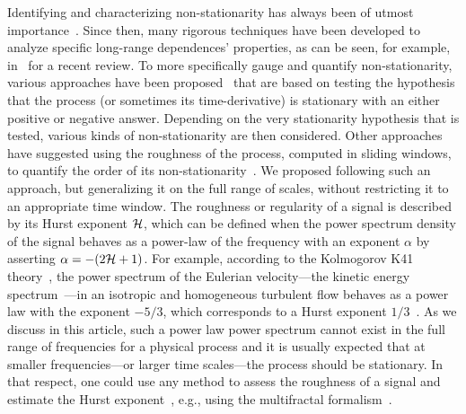 \documentclass[aps,pra,groupedaddress,notitlepage]{revtex4-1}
\begin{document}
Identifying and characterizing non-stationarity has always been of utmost importance~\cite{Grenander1957,Priestley1969}. 
Since then, many rigorous techniques have been developed to analyze specific long-range dependences' properties, as can be seen, for example, in~\cite{Beran:2013} for a recent review. To more specifically gauge and quantify non-stationarity, various
approaches have been proposed~\cite{Sachs2000,Dwivedi2011,Dette2011,Barlett2015,Jentsch2015,Cardinally2018} that are based on testing the hypothesis that the process (or sometimes its time-derivative) is stationary with an either positive or negative answer. Depending on the very stationarity hypothesis that is tested, various kinds of non-stationarity are then considered. 
%
Other approaches have suggested using the roughness of the process, computed in sliding windows, to quantify the order of its non-stationarity~\cite{Das2016}. We proposed following such an approach, but generalizing it on the full range of scales, without restricting it to an appropriate time window.
{The roughness or regularity of a signal is described by its Hurst exponent ${\cal H}$, which can be defined when the power spectrum density of the signal behaves as a power-law of the frequency with an exponent $\alpha$ by asserting $\alpha=-(2{\cal H}+1)$. For example, according to the Kolmogorov K41 theory~\cite{Kolmogorov1991}, the power spectrum of the Eulerian velocity---the kinetic energy spectrum~---in an isotropic and homogeneous turbulent flow behaves as a power law with the exponent $-5/3$, which corresponds to a Hurst exponent $1/3$~\cite{Frisch:1995}. As we discuss in this article, such a power law power spectrum cannot exist in the full range of frequencies for a physical process and it is usually expected that at smaller frequencies---or larger time scales---the process should be stationary.}
In that respect, one could use any method to assess the {roughness} of a signal {and estimate the Hurst exponent~\cite{Gneiting:2012}}, e.g., using the multifractal formalism~\cite{Muzy:1993, Wendt:2009}.

\end{document}
